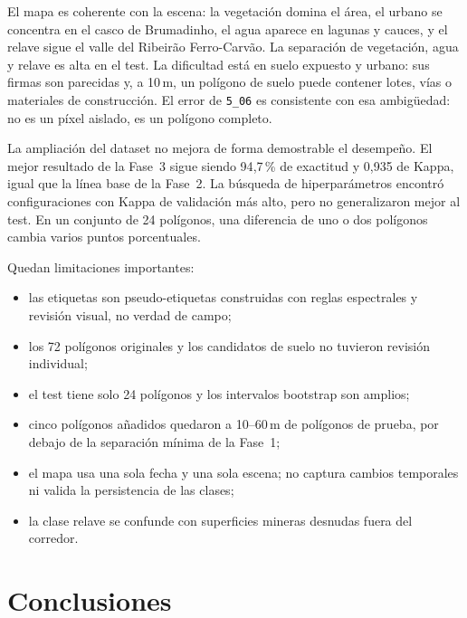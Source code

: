 \documentclass{article}
\begin{document}
El mapa es coherente con la escena: la vegetación domina el área, el urbano se concentra en el casco de Brumadinho, el agua aparece en lagunas y cauces, y el relave sigue el valle del Ribeirão Ferro-Carvão. La separación de vegetación, agua y relave es alta en el test. La dificultad está en suelo expuesto y urbano: sus firmas son parecidas y, a 10\,m, un polígono de suelo puede contener lotes, vías o materiales de construcción. El error de \texttt{5\_06} es consistente con esa ambigüedad: no es un píxel aislado, es un polígono completo.

La ampliación del dataset no mejora de forma demostrable el desempeño. El mejor resultado de la Fase~3 sigue siendo 94{,}7\,\% de exactitud y 0{,}935 de Kappa, igual que la línea base de la Fase~2. La búsqueda de hiperparámetros encontró configuraciones con Kappa de validación más alto, pero no generalizaron mejor al test. En un conjunto de 24 polígonos, una diferencia de uno o dos polígonos cambia varios puntos porcentuales.

Quedan limitaciones importantes:

\begin{itemize}
 \item las etiquetas son pseudo-etiquetas construidas con reglas espectrales y revisión visual, no verdad de campo;
 \item los 72 polígonos originales y los candidatos de suelo no tuvieron revisión individual;
 \item el test tiene solo 24 polígonos y los intervalos bootstrap son amplios;
 \item cinco polígonos añadidos quedaron a 10--60\,m de polígonos de prueba, por debajo de la separación mínima de la Fase~1;
 \item el mapa usa una sola fecha y una sola escena; no captura cambios temporales ni valida la persistencia de las clases;
 \item la clase relave se confunde con superficies mineras desnudas fuera del corredor.
\end{itemize}

\section{Conclusiones}
\end{document}
